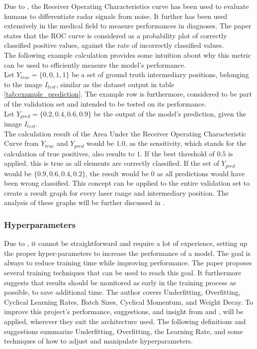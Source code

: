 Due to \cite{rakotomamonjy2004optimizing}, the Receiver Operating Characteristics curve has been used to evaluate humans to differentiate radar signals from noise. It further has been used extensively in the medical field to measure performances in diagnoses. The paper states that the ROC curve is considered as a probability plot of correctly classified positive values, against the rate of incorrectly classified values.\\

The following example calculation provides some intuition about why this metric can be used to efficiently measure the model's performance.\\

Let $Y_{true} = \{0,0,1,1\}$ be a set of ground truth intermediary positions, belonging to the image $I_{test}$, similar as the dataset output in table \ref{tab:example_prediction}. The example row is furthermore, considered to be part of the validation set and intended to be tested on its performance.\\ 

Let $Y_{pred} = \{0.2,0.4,0.6,0.9\}$ be the output of the model's prediction, given the image $I_{test}$.\\

The calculation result of the Area Under the Receiver Operating Characteristic Curve from $Y_{true} $  and $ Y_{pred} $ would be $ 1.0 $, as the sensitivity, which stands for the calculation of true positives, also results to $ 1 $. If the best threshold of $ 0.5 $ is applied, this is true as all elements are correctly classified. If the set of $Y_{pred} $ would be $ \{0.9,0.6,0.4,0.2\}$, the result would be $0$ as all predictions would have been wrong classified. This concept can be applied to the entire validation set to create a result graph for every laser range and intermediary position. The analysis of these graphs will be further discussed in .\\

\subsubsection{Hyperparameters \label{hyperparameters} }
Due to \cite{DBLP:journals/corr/abs-1803-09820}, it cannot be straightforward and require a lot of experience, setting up the proper hyper-parameters to increase the performance of a model. The goal is always to reduce training time while improving performance. The paper proposes several training techniques that can be used to reach this goal. It furthermore suggests that results should be monitored as early in the training process as possible, to save additional time. The author covers Underfitting, Overfitting, Cyclical Learning Rates, Batch Sizes, Cyclical Momentum, and Weight Decay. To improve this project's performance, suggestions, and insight from \cite{DBLP:journals/corr/abs-1803-09820} and \cite{Goodfellow-et-al-2016}, will be applied, wherever they suit the architecture used. The following definitions and suggestions summarize Underfitting, Overfitting, the Learning Rate, and some techniques of how to adjust and manipulate hyperparameters.\\

